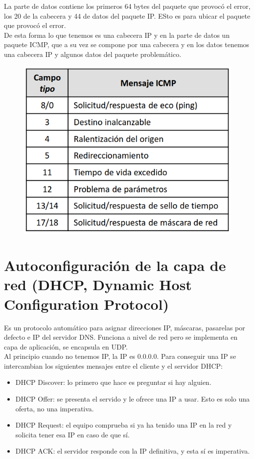 La parte de datos contiene los primeros 64 bytes del paquete que provocó el error, los 20 de la cabecera y 44 de datos del paquete IP. ESto es para ubicar el paquete que provocó el error.\\

De esta forma lo que tenemos es una cabecera IP y en la parte de datos un paquete ICMP, que a su vez se compone por una cabecera y en los datos tenemos una cabecera IP y algunos datos del paquete problemático.

\begin{figure}[H]
    \centering
    \includegraphics[width=0.4\linewidth]{./images/codigos-icmp.png}
    \label{fig:icmp}
\end{figure}

\section{Autoconfiguración de la capa de red (DHCP, Dynamic Host Configuration Protocol)}

Es un protocolo automático para asignar direcciones IP, máscaras, pasarelas por defecto e IP del servidor DNS. Funciona a nivel de red pero se implementa en capa de aplicación, se encapsula en UDP. \\

Al principio cuando no tenemos IP, la IP es 0.0.0.0. Para conseguir una IP se intercambian los siguientes mensajes entre el cliente y el servidor DHCP:
\begin{itemize}
    \item DHCP Discover: lo primero que hace es preguntar si hay alguien. 
    \item DHCP Offer: se presenta el servido y le ofrece una IP a usar. Esto es solo una oferta, no una imperativa.
    \item DHCP Request: el equipo comprueba si ya ha tenido una IP en la red y solicita tener esa IP en caso de que sí. 
    \item DHCP ACK: el servidor responde con la IP definitiva, y esta sí es imperativa. 
\end{itemize}

